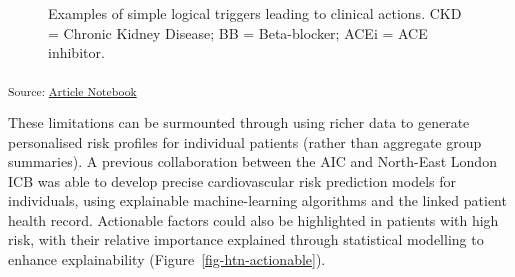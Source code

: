 \documentclass[
  letterpaper,
  DIV=11,
  numbers=noendperiod]{scrartcl}
\begin{document}
\begin{figure}


\caption{\label{fig-simple-pathway-action}Examples of simple logical
triggers leading to clinical actions. CKD = Chronic Kidney Disease; BB =
Beta-blocker; ACEi = ACE inhibitor.}

\end{figure}%

\textsubscript{Source:
\href{https://d3london.github.io/sde_aic_docs/index.qmd.html}{Article
Notebook}}

These limitations can be surmounted through using richer data to
generate personalised risk profiles for individual patients (rather than
aggregate group summaries). A previous collaboration between the AIC and
North-East London ICB was able to develop precise cardiovascular risk
prediction models for individuals, using explainable machine-learning
algorithms and the linked patient health record. Actionable factors
could also be highlighted in patients with high risk, with their
relative importance explained through statistical modelling to enhance
explainability (Figure~\ref{fig-htn-actionable}).
\end{document}
